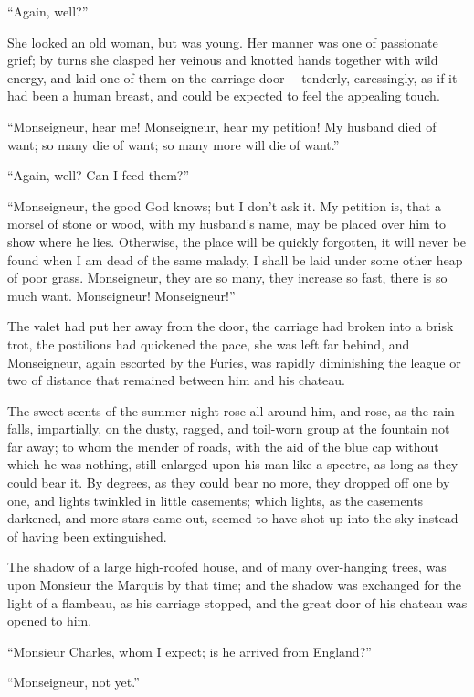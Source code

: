 ``Again, well?''

She looked an old woman, but was young.  Her manner was one of
passionate grief; by turns she clasped her veinous and knotted hands
together with wild energy, and laid one of them on the carriage-door%
---tenderly, caressingly, as if it had been a human breast, and could
be expected to feel the appealing touch.

``Monseigneur, hear me!  Monseigneur, hear my petition!  My husband
died of want; so many die of want; so many more will die of want.''

``Again, well?  Can I feed them?''

``Monseigneur, the good God knows; but I don't ask it.  My petition is,
that a morsel of stone or wood, with my husband's name, may be placed
over him to show where he lies.  Otherwise, the place will be quickly
forgotten, it will never be found when I am dead of the same malady,
I shall be laid under some other heap of poor grass.  Monseigneur,
they are so many, they increase so fast, there is so much want.
Monseigneur!  Monseigneur!''

The valet had put her away from the door, the carriage had broken
into a brisk trot, the postilions had quickened the pace, she was
left far behind, and Monseigneur, again escorted by the Furies, was
rapidly diminishing the league or two of distance that remained
between him and his chateau.

The sweet scents of the summer night rose all around him, and rose,
as the rain falls, impartially, on the dusty, ragged, and toil-worn
group at the fountain not far away; to whom the mender of roads, with
the aid of the blue cap without which he was nothing, still enlarged
upon his man like a spectre, as long as they could bear it.
By degrees, as they could bear no more, they dropped off one by one,
and lights twinkled in little casements; which lights, as the
casements darkened, and more stars came out, seemed to have shot up
into the sky instead of having been extinguished.

The shadow of a large high-roofed house, and of many over-hanging
trees, was upon Monsieur the Marquis by that time; and the shadow was
exchanged for the light of a flambeau, as his carriage stopped,
and the great door of his chateau was opened to him.

``Monsieur Charles, whom I expect; is he arrived from England?''

``Monseigneur, not yet.''



